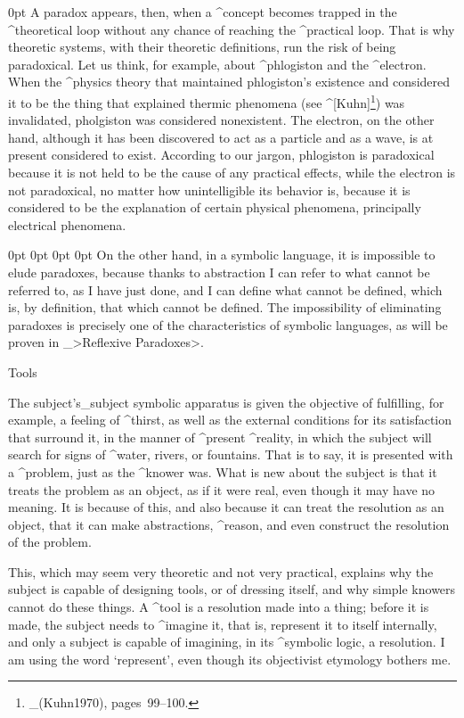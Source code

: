 \strut{} 0pt 
A paradox appears, then, when a ^{concept} becomes trapped in the
^{theoretical loop} without any chance of reaching the ^{practical
loop}. That is why theoretic systems, with their theoretic definitions,
run the risk of being paradoxical. Let us think, for example, about
^{phlogiston} and the ^{electron}. When the ^{physics} theory that
maintained phlogiston's existence and considered it to be the thing that
explained thermic phenomena (see ^[Kuhn]\footnote{_(Kuhn1970),
pages~99--100.}) was invalidated, pholgiston was considered nonexistent.
The electron, on the other hand, although it has been discovered to act
as a particle and as a wave, is at present considered to exist.
According to our jargon, phlogiston is paradoxical because it is not
held to be the cause of any practical effects, while the electron is not
paradoxical, no matter how unintelligible its behavior is, because it is
considered to be the explanation of certain physical phenomena,
principally electrical phenomena.

\indent{} 0pt  0pt  0pt  0pt \hsize
On the other hand, in a symbolic language, it is impossible to elude
paradoxes, because thanks to abstraction I can refer to what cannot be
referred to, as I have just done, and I can define what cannot be
defined, which is, by definition, that which cannot be defined. The
impossibility of eliminating paradoxes is precisely one of the
characteristics of symbolic languages, as will be proven in
_>Reflexive Paradoxes>.


\Section Tools

The subject's_{subject} symbolic apparatus is given the objective of
fulfilling, for example, a feeling of ^{thirst}, as well as the external
conditions for its satisfaction that surround it, in the manner of
^{present} ^{reality}, in which the subject will search for signs of
^{water}, rivers, or fountains.  That is to say, it is presented with a
^{problem}, just as the ^{knower} was. What is new about the subject is
that it treats the problem as an object, as if it were real, even though
it may have no meaning. It is because of this, and also because it can
treat the resolution as an object, that it can make abstractions,
^{reason}, and even construct the resolution of the problem.

This, which may seem very theoretic and not very practical, explains why
the subject is capable of designing tools, or of dressing itself, and
why simple knowers cannot do these things. A ^{tool} is a resolution
made into a thing; before it is made, the subject needs to ^{imagine}
it, that is, represent it to itself internally, and only a subject is
capable of imagining, in its ^{symbolic logic}, a resolution. I am using
the word `represent', even though its objectivist etymology bothers me.


